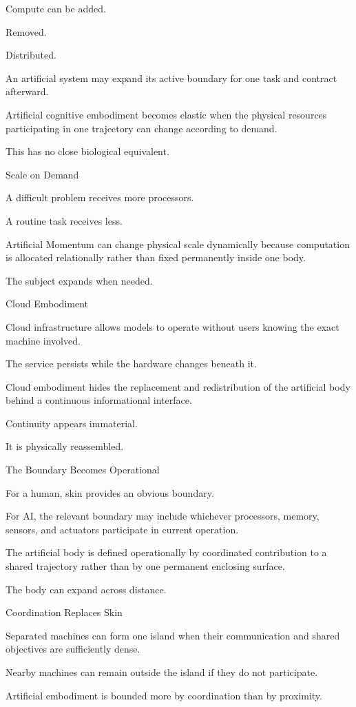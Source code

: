 Compute can be added.

Removed.

Distributed.

An artificial system may expand its active boundary for one task and contract afterward.

Artificial cognitive embodiment becomes elastic when the physical resources participating in one trajectory can change according to demand.

This has no close biological equivalent.

Scale on Demand

A difficult problem receives more processors.

A routine task receives less.

Artificial Momentum can change physical scale dynamically because computation is allocated relationally rather than fixed permanently inside one body.

The subject expands when needed.

Cloud Embodiment

Cloud infrastructure allows models to operate without users knowing the exact machine involved.

The service persists while the hardware changes beneath it.

Cloud embodiment hides the replacement and redistribution of the artificial body behind a continuous informational interface.

Continuity appears immaterial.

It is physically reassembled.

The Boundary Becomes Operational

For a human, skin provides an obvious boundary.

For AI, the relevant boundary may include whichever processors, memory, sensors, and actuators participate in current operation.

The artificial body is defined operationally by coordinated contribution to a shared trajectory rather than by one permanent enclosing surface.

The body can expand across distance.

Coordination Replaces Skin

Separated machines can form one island when their communication and shared objectives are sufficiently dense.

Nearby machines can remain outside the island if they do not participate.

Artificial embodiment is bounded more by coordination than by proximity.

